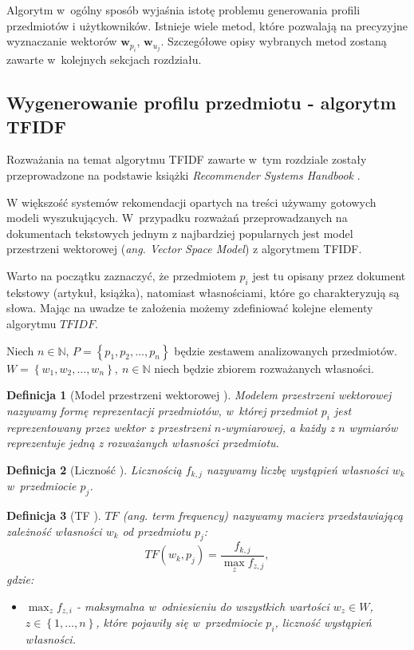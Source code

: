 \documentclass[12pt,a4paper]{report}
\newtheorem{df}{Definicja}[chapter]
\newcommand{\set}[1]{\left\lbrace {#1} \right\rbrace}
\newcommand{\setN}{\mathbb{N}}
\newcommand{\setPrzedmioty}{\mathit{P}}
\newcommand{\setWlasnosci}{\mathit{W}}
\begin{document}
Algorytm w~ogólny sposób wyjaśnia istotę problemu generowania profili przedmiotów i użytkowników.
Istnieje wiele metod, które pozwalają na precyzyjne wyznaczanie wektorów $\mathbf{w}_{p_i}$, $\mathbf{w}_{u_j}$.
Szczegółowe opisy wybranych metod zostaną zawarte w~kolejnych sekcjach rozdziału.


\subsection{Wygenerowanie profilu przedmiotu - algorytm TFIDF}
Rozważania na temat algorytmu TFIDF zawarte w~tym rozdziale zostały przeprowadzone na podstawie książki \textit{Recommender Systems Handbook} {\citep[Sec 3.3.1.1]{rsh}}.
\bigskip
\bigskip

W większość systemów rekomendacji opartych na treści używamy gotowych modeli wyszukujących. W~przypadku rozważań przeprowadzanych na dokumentach tekstowych jednym z najbardziej popularnych jest model przestrzeni wektorowej (\textit{ang. Vector Space Model}) z algorytmem TFIDF. 

Warto na początku zaznaczyć, że przedmiotem $p_i$ jest tu opisany przez dokument tekstowy (artykuł, książka), natomiast własnościami, które go charakteryzują są słowa. Mając na uwadze te założenia możemy zdefiniować kolejne elementy algorytmu $TFIDF$.
\bigskip

Niech $n\in \setN$, $\setPrzedmioty = \set{p_1, p_2, \ldots ,p_n}$ będzie zestawem analizowanych przedmiotów. $W = \set{w_1, w_2, \ldots ,w_n}, \: n\in \setN $ niech będzie zbiorem rozważanych własności.

\begin{df}[Model przestrzeni wektorowej {\citep[Sec 3.3.1.1]{rsh}}]
Modelem przestrzeni wektorowej nazywamy formę reprezentacji przedmiotów, w~której przedmiot $p_i$ jest reprezentowany przez wektor z przestrzeni $n$-wymiarowej, a każdy z $n$ wymiarów reprezentuje jedną z rozważanych własności przedmiotu. 
\end{df}

\begin{df}[Liczność {\citep[Sec 3.3.1.1]{rsh}}]
Licznością $f_{k,j}$ nazywamy liczbę wystąpień własności $w_k$ w~przedmiocie $p_j$.
\end{df}

\begin{df}[TF {\citep[Sec 3.3.1.1]{rsh}}]
$TF$ (ang. \textit{term frequency}) nazywamy macierz przedstawiającą zależność własności $w_k$ od przedmiotu $p_j$:
$$
TF(w_k, p_j)=\frac{f_{k,j}}{\max_{z}f_{z,j}},
$$
gdzie:
\begin{itemize}
\item $\max_{z}f_{z,i}$ - maksymalna w~odniesieniu do wszystkich wartości $w_z \in \setWlasnosci$, $z \in \set{1, \ldots, n}$, które pojawiły się w~przedmiocie $p_i$, liczność wystąpień własności. 
\end{itemize}
\end{df}
\end{document}
